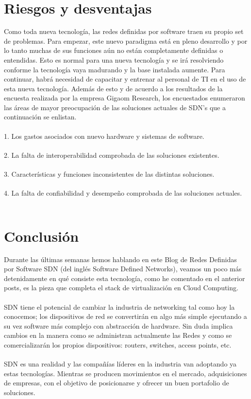 \documentclass[12pt]{report}
\begin{document}
\section{Riesgos y desventajas}
{
Como toda nueva tecnología, las redes definidas por software traen su propio set de problemas. Para
empezar, este nuevo paradigma está en pleno desarrollo y por lo tanto muchas de sus funciones aún no están
completamente definidas o entendidas. Esto es normal para una nueva tecnología y se irá resolviendo conforme
la tecnología vaya madurando y la base instalada aumente. Para continuar, habrá necesidad de capacitar y
entrenar al personal de TI en el uso de esta nueva tecnología. Además de esto y de acuerdo a los resultados de la
encuesta realizada por la empresa Gigaom Research, los encuestados enumeraron las áreas de mayor
preocupación de las soluciones actuales de SDN’s que a continuación se enlistan.\\\\
1. Los gastos asociados con nuevo hardware y sistemas de software.\\\\
2. La falta de interoperabilidad comprobada de las soluciones existentes.\\\\
3. Características y funciones inconsistentes de las distintas soluciones.\\\\
4. La falta de confiabilidad y desempeño comprobada de las soluciones actuales.\\\\
}

\section{Conclusión}
{
Durante las últimas semanas hemos hablando en este Blog de Redes Definidas por Software SDN (del inglés Software Defined Networks), veamos un poco más detenidamente en qué consiste esta tecnología, como he comentado en el anterior posts, es la pieza que completa el stack de virtualización en Cloud Computing.\\\\

SDN tiene el potencial de cambiar la industria de networking tal como hoy la conocemos; los dispositivos de red se convertirán en algo más simple ejecutando a su vez software más complejo con abstracción de hardware. Sin duda implica cambios en la manera como se administran actualmente las Redes y como se comercializarán los propios dispositivos: routers, switches, access points, etc.
\\\\
SDN es una realidad y las compañías líderes en la industria van adoptando ya estas tecnologías. Mientras se producen movimientos en el mercado, adquisiciones de empresas, con el objetivo de posicionarse y ofrecer un buen portafolio de soluciones.
}
\end{document}

